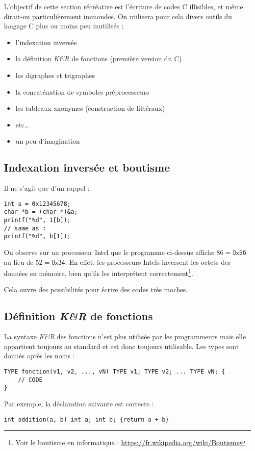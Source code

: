 \documentclass[../../../main.tex]{subfiles}
\begin{document}
L'objectif de cette section récréative est l'écriture de codes C illisibles, et même dirait-on particulièrement immondes. On utilisera pour cela divers outils du langage C plus ou moins peu inutilisés :
\begin{itemize}
	\item l'indexation inversée
	\item la définition \textit{K\&R} de fonctions (première version du C)
	\item les digraphes et trigraphes
	\item la concaténation de symboles préprocesseurs
	\item les tableaux anonymes (construction de littéraux)
	\item etc\dots
	\item un peu d'imagination
\end{itemize}
\subsection{Indexation inversée et boutisme}
Il ne s'agit que d'un rappel :
\begin{verbatim}
int a = 0x12345678;
char *b = (char *)&a;
printf("%d", 1[b]);
// same as :
printf("%d", b[1]);
\end{verbatim}
On observe sur un processeur Intel que le programme ci-dessus affiche $86 = \textsf{0x56}$ au lieu de $52 = \textsf{0x34}$. En effet, les processeurs Intels inversent les octets des données en mémoire, bien qu'ils les interprétent correctement\footnote{Voir le boutisme en informatique : \url{https://fr.wikipedia.org/wiki/Boutisme}}.
 
Cela ouvre des possibilités pour écrire des codes très moches.
\subsection{Définition \textit{K\&R} de fonctions}
La syntaxe \textit{K\&R} des fonctions n'est plus utilisée par les programmeurs mais elle appartient toujours au standard et est donc toujours utilisable. Les types sont donnés après les noms :
\begin{verbatim}
TYPE fonction(v1, v2, ..., vN) TYPE v1; TYPE v2; ... TYPE vN; {
	// CODE
}
\end{verbatim}
Par exemple, la déclaration suivante est correcte :
\begin{verbatim}
int addition(a, b) int a; int b; {return a + b}
\end{verbatim}
\end{document}
